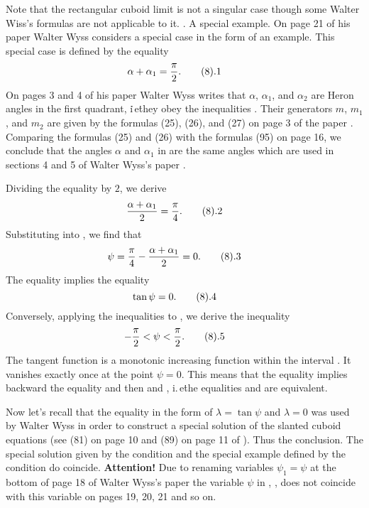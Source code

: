 \medskip
\noindent
Note that the rectangular cuboid limit is not a singular case though 
some Walter Wiss's formulas are not applicable to it. 
. A special example. 
\endhead
    On page 21 of his paper  Walter Wyss considers a special case 
in the form of an example. This special case is defined by the equality
$$
\hskip -2em
\alpha+\alpha_1=\frac{\pi}{2}.
\mytag{8.1}
$$
On pages 3 and 4 of his paper Walter Wyss writes that $\alpha$, $\alpha_1$, 
and $\alpha_2$ are Heron angles in the first quadrant, i\.\,e\. they obey
the inequalities . Their generators $m$, $m_1$, and $m_2$ are
given by the formulas (25), (26), and (27) on page 3 of the paper .
Comparing the formulas (25) and (26) with the formulas (95) on page 16, we
conclude that the angles $\alpha$ and $\alpha_1$ in  are the 
same angles which are used in sections 4 and 5 of Walter Wyss's paper 
.\par
     Dividing the equality  by $2$, we derive
$$
\hskip -2em
\frac{\alpha+\alpha_1}{2}=\frac{\pi}{4}.
\mytag{8.2}
$$
Substituting  into , we find that
$$
\hskip -2em
\psi=\frac{\pi}{4}-\frac{\alpha+\alpha_1}{2}=0.
\mytag{8.3}
$$
The equality  implies the equality
$$
\hskip -2em
\tan\psi=0.
\mytag{8.4}
$$
Conversely, applying the inequalities  to , we
derive the inequality
$$
\hskip -2em
-\frac{\pi}{2}<\psi<\frac{\pi}{2}.
\mytag{8.5}
$$
The tangent function is a monotonic increasing function within the interval 
. It vanishes exactly once at the point $\psi=0$. This means 
that the equality  implies backward the equality 
and then  and , i.\,e\. the equalities 
 and  \pagebreak are equivalent.\par
     Now let's recall that the equality  in the form of 
$\lambda=\tan\psi$ and $\lambda=0$ was used by Walter Wyss in order to construct 
a special solution of the slanted cuboid equations (see (81) on page 10 and (89) 
on page 11 of ). Thus the conclusion.
 The special solution given by the condition  and 
the special example defined by the condition  do coincide. 
\endproclaim
\noindent
{\bf Attention!} Due to renaming variables $\psi_1=\psi$ at the bottom of page 
18 of Walter Wyss's paper  the variable $\psi$ in , 
,  does not coincide with this variable on pages
19, 20, 21 and so on.\par
